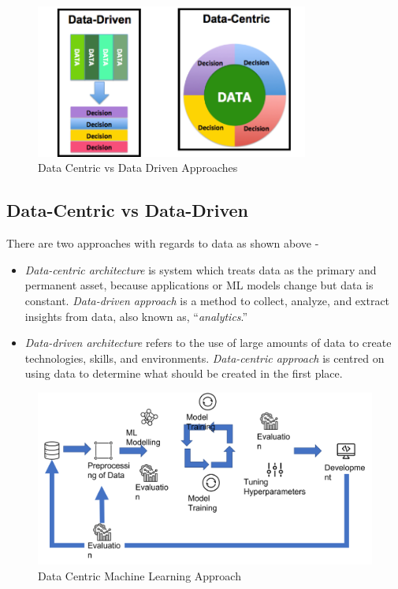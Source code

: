 \begin{figure}[h!]
    \centering
    \includegraphics[width=0.8\textwidth]{img/data-centric-ML_2.png}
    \caption{Data Centric vs Data Driven Approaches}
    \label{fig:data-centric-vs-driven}
\end{figure}

\subsection{Data-Centric vs Data-Driven}
There are two approaches with regards to data as shown above -
\begin{itemize}
    \item \textit{Data-centric architecture} is system which treats data as the primary and permanent asset, because applications or ML models change but data is constant. \textit{Data-driven approach} is a method to collect, analyze, and extract insights from data, also known as, “\textit{analytics}.”
    \item \textit{Data-driven architecture} refers to the use of large amounts of data to create technologies, skills, and environments. \textit{Data-centric approach} is centred on using data to determine what should be created in the first place.
\end{itemize}

\begin{figure}[h!]
    \centering
    \includegraphics[width=1.0\textwidth]{img/data_centric_ml.png}
    \caption{Data Centric Machine Learning Approach}
    \label{fig:datacentric-ML-approach}
\end{figure}

